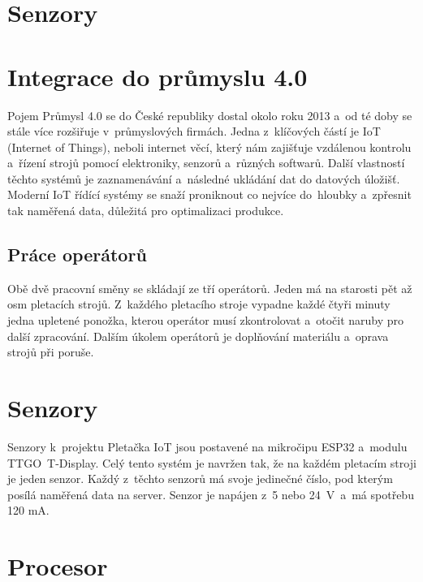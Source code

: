 \documentclass{template/socthesis}
\begin{document}
\section{Senzory}














\section{Integrace do průmyslu 4.0}
Pojem Průmysl 4.0 se do České republiky dostal okolo roku 2013 a~od té doby se stále více rozšiřuje v~průmyslových firmách.
Jedna z~klíčových částí je IoT (Internet of Things), neboli internet věcí, který nám zajišťuje vzdálenou kontrolu a~řízení strojů pomocí elektroniky, senzorů a~různých softwarů.
Další vlastností těchto systémů je zaznamenávání a~následné ukládání dat do datových úložišť.
Moderní IoT řídící systémy se snaží proniknout co nejvíce do~hloubky a~zpřesnit tak naměřená data, důležitá pro optimalizaci produkce.   

\subsection{Práce operátorů}
Obě dvě pracovní směny se skládají ze tří operátorů. Jeden má na starosti pět až osm pletacích strojů.
Z~každého pletacího stroje vypadne každé čtyři minuty jedna upletené ponožka, kterou operátor musí zkontrolovat a~otočit naruby pro další zpracování.
Dalším úkolem operátorů je doplňování materiálu a~oprava strojů při poruše.


\section{Senzory}

Senzory k~projektu Pletačka IoT jsou postavené na mikročipu ESP32 a~modulu TTGO~T-Display.
Celý tento systém je navržen tak, že na každém pletacím stroji je jeden senzor.
Každý z~těchto senzorů má svoje jedinečné číslo, pod kterým posílá naměřená data na server.
Senzor je napájen z~5 nebo 24~V~a~má spotřebu 120 mA.

\section{Procesor}
\end{document}
